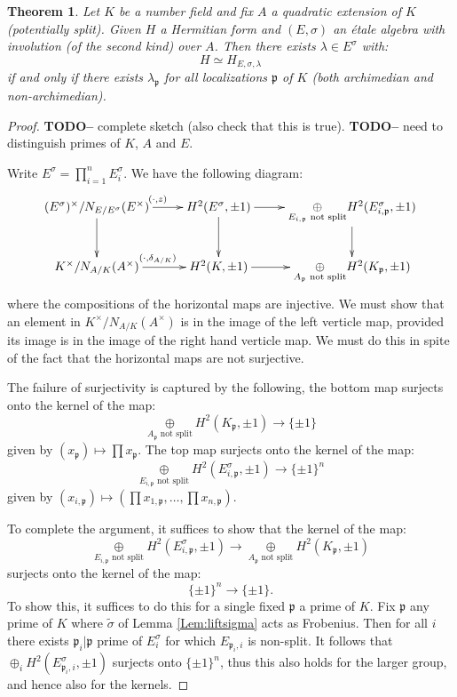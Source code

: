 \documentclass{article}
\theoremstyle{plain}
\newtheorem{theorem}{Theorem}[section]
\theoremstyle{definition}
\newcommand{\fp}{\mathfrak{p}}
\newcommand{\TODO}[1]{\textbf{TODO-#1}}
\begin{document}
\begin{theorem}
Let $K$ be a number field and fix $A$ a quadratic extension of $K$ (potentially split).
Given $H$ a Hermitian form and $(E,\sigma)$ an \'etale algebra with involution (of the second kind) over $A$. Then there exists $\lambda \in E^\sigma$ with:
\[ H \simeq H_{E,\sigma,\lambda} \]
if and only if there exists $\lambda_\fp$ for all localizations $\fp$ of $K$ (both archimedian and non-archimedian).
\end{theorem}
\begin{proof}
\TODO - complete sketch (also check that this is true).
\TODO - need to distinguish primes of $K$, $A$ and $E$.

Write $E^\sigma = \prod_{i=1}^n E^\sigma_i$.
We have the following diagram:
\[
\xymatrix{
(E^\sigma)^\times/N_{E/E^\sigma}(E^\times) \ar[r]^{(\cdot,z)} \ar[d]& H^2(E^\sigma, \pm 1) \ar[r] \ar[d]& \underset{E_{i,\fp} \text{ not split}}\oplus H^2(E^\sigma_{i,\fp},\pm 1) \ar[d]\\
K^\times/N_{A/K}(A^\times) \ar[r]^{(\cdot,\delta_{A/K})} & H^2(K, \pm 1) \ar[r] & \underset{A_\fp \text{ not split}}\oplus H^2(K_\fp,\pm 1)
}
\]
where the compositions of the horizontal maps are injective.
We must show that an element in $K^\times/N_{A/K}(A^\times) $ is in the image of the left verticle map, provided its image is in the image of the right hand verticle map.
We must do this in spite of the fact that the horizontal maps are not surjective.

The failure of surjectivity is captured by the following, the bottom map surjects onto the kernel of the map:
\[ \underset{A_\fp \text{ not split}}\oplus H^2(K_\fp,\pm 1)  \rightarrow \{ \pm1\} \]
given by $(x_\fp) \mapsto \prod x_\fp$. The top map surjects onto the kernel of the map:
\[ \underset{E_{i,\fp} \text{ not split}}\oplus H^2(E_{i,\fp}^\sigma,\pm 1)  \rightarrow \{ \pm1\}^n \]
given by $(x_{i,\fp}) \mapsto (\prod x_{1,\fp}, \ldots, \prod x_{n,\fp}) $.

To complete the argument, it suffices to show that the kernel of the map:
\[\underset{E_{i,\fp} \text{ not split}}\oplus H^2(E_{i,\fp}^\sigma,\pm 1)  \rightarrow \underset{A_\fp \text{ not split}}\oplus H^2(K_\fp,\pm 1) \]
surjects onto the kernel of the map:
\[ \{ \pm1\}^n \rightarrow \{ \pm1\}. \]
To show this, it suffices to do this for a single fixed $\fp$ a prime of $K$.
Fix $\fp$ any prime of $K$ where $\tilde{\sigma}$ of Lemma \ref{Lem:liftsigma} acts as Frobenius. Then for all $i$ there exists $\fp_i | \fp$ prime of $E_i^\sigma$ for which $E_{\fp_i,i}$ is non-split. It follows that $\oplus_i H^2(E_{\fp_i,i}^\sigma,\pm1)$ surjects onto $\{\pm 1\}^n$, thus this also holds for the larger group, and hence also for the kernels.
\end{proof}
\end{document}
